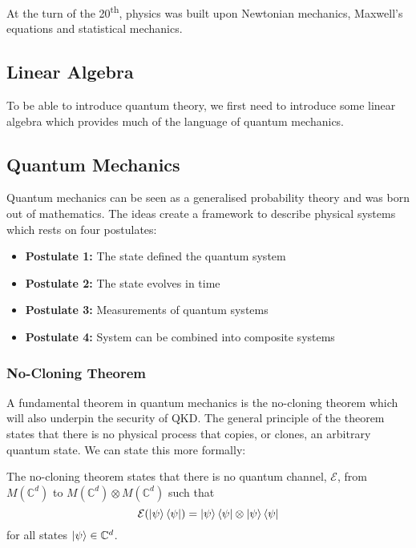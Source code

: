 At the turn of the 20\textsuperscript{th}, physics was built upon Newtonian mechanics, Maxwell's equations and statistical mechanics. 

\subsection{Linear Algebra}

To be able to introduce quantum theory, we first need to introduce some linear algebra which provides much of the language of quantum mechanics.

\subsection{Quantum Mechanics}

Quantum mechanics can be seen as a generalised probability theory and was born out of mathematics. The ideas create a framework to describe physical systems which rests on four postulates:

\begin{itemize}
	\item[] \textbf{Postulate 1:} The state defined the quantum system
	\item[] \textbf{Postulate 2:} The state evolves in time
	\item[] \textbf{Postulate 3:} Measurements of quantum systems
	\item[] \textbf{Postulate 4:} System can be combined into composite systems
\end{itemize}

\subsubsection{No-Cloning Theorem}

A fundamental theorem in quantum mechanics is the {\color{bristol-red} no-cloning theorem} which will also underpin the security of \ac{QKD}. The general principle of the theorem states that there is no physical process that copies, or clones, an arbitrary quantum state. We can state this more formally:

\begin{theorem}
	 The no-cloning theorem states that there is no quantum channel, $\mathcal{E}$, from $M(\mathbb{C}^d)$ to $M(\mathbb{C}^d) \otimes M(\mathbb{C}^d)$ such that
	 \begin{equation*}
	 	\mathcal{E}(\ket{\psi}\bra{\psi}) = \ket{\psi}\bra{\psi} \otimes \ket{\psi}\bra{\psi}
	 \end{equation*}
	 for all states $\ket{\psi} \in \mathbb{C}^d$.
\end{theorem}

